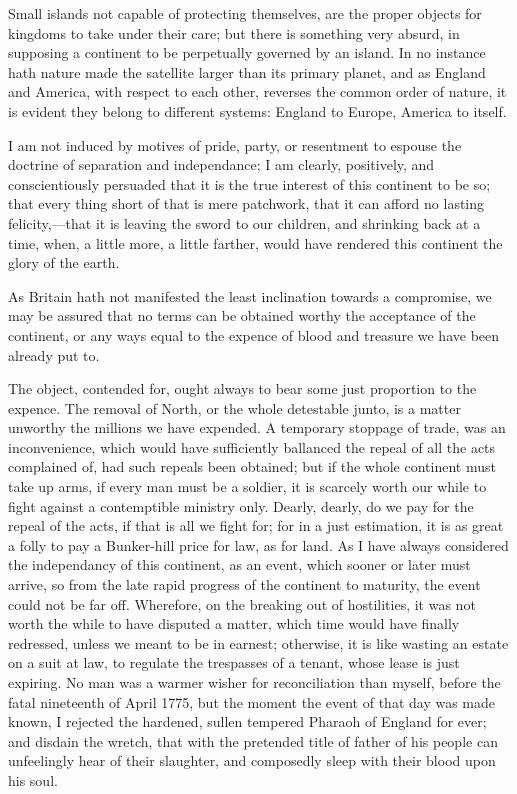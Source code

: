 \documentclass[12pt,oneside]{memoir}
\begin{document}
Small islands not capable of protecting themselves, are the proper
objects for kingdoms to take under their care; but there is
something very absurd, in supposing a continent to be perpetually
governed by an island. In no instance hath nature made the satellite
larger than its primary planet, and as England and America, with
respect to each other, reverses the common order of nature, it is
evident they belong to different systems: England to Europe, America
to itself.

I am not induced by motives of pride, party, or resentment to
espouse the doctrine of separation and independance; I am clearly,
positively, and conscientiously persuaded that it is the true
interest of this continent to be so; that every thing short of that
is mere patchwork, that it can afford no lasting felicity,---that it
is leaving the sword to our children, and shrinking back at a time,
when, a little more, a little farther, would have rendered this
continent the glory of the earth.

As Britain hath not manifested the least inclination towards a
compromise, we may be assured that no terms can be obtained worthy
the acceptance of the continent, or any ways equal to the expence of
blood and treasure we have been already put to.

The object, contended for, ought always to bear some just proportion
to the expence. The removal of North, or the whole detestable junto,
is a matter unworthy the millions we have expended. A temporary
stoppage of trade, was an inconvenience, which would have
sufficiently ballanced the repeal of all the acts complained of, had
such repeals been obtained; but if the whole continent must take up
arms, if every man must be a soldier, it is scarcely worth our while
to fight against a contemptible ministry only. Dearly, dearly, do we
pay for the repeal of the acts, if that is all we fight for; for in
a just estimation, it is as great a folly to pay a Bunker-hill price
for law, as for land. As I have always considered the independancy
of this continent, as an event, which sooner or later must arrive,
so from the late rapid progress of the continent to maturity, the
event could not be far off. Wherefore, on the breaking out of
hostilities, it was not worth the while to have disputed a matter,
which time would have finally redressed, unless we meant to be in
earnest; otherwise, it is like wasting an estate on a suit at law,
to regulate the trespasses of a tenant, whose lease is just expiring.
No man was a warmer wisher for reconciliation than myself, before
the fatal nineteenth of April 1775, but the moment the event of that
day was made known, I rejected the hardened, sullen tempered Pharaoh
of England for ever; and disdain the wretch, that with the pretended
title of father of his people can unfeelingly hear of their
slaughter, and composedly sleep with their blood upon his soul.
\end{document}
